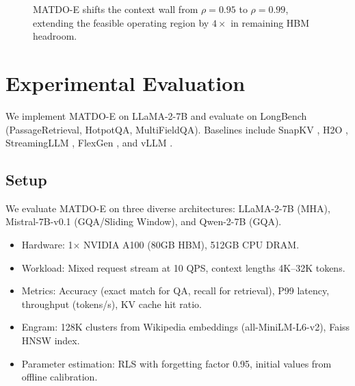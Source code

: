 \documentclass[11pt,a4paper]{article}
\theoremstyle{plain}
\theoremstyle{definition}
\begin{document}
\begin{figure}[t]
\centering
{}
\caption{MATDO-E shifts the context wall from $\rho=0.95$ to $\rho=0.99$, extending the feasible operating region by $4\times$ in remaining HBM headroom.}
\label{fig:postpone}
\end{figure}

\section{Experimental Evaluation}
\label{sec:experiments}
We implement MATDO-E on LLaMA-2-7B and evaluate on LongBench (PassageRetrieval, HotpotQA, MultiFieldQA). Baselines include SnapKV \cite{snapkv}, H2O \cite{h2o}, StreamingLLM \cite{streamingllm}, FlexGen \cite{flexgen}, and vLLM \cite{vllm}.

\subsection{Setup}
We evaluate MATDO-E on three diverse architectures: LLaMA-2-7B (MHA), Mistral-7B-v0.1 (GQA/Sliding Window), and Qwen-2-7B (GQA).
\begin{itemize}
    \item Hardware: 1$\times$ NVIDIA A100 (80GB HBM), 512GB CPU DRAM.
    \item Workload: Mixed request stream at 10 QPS, context lengths 4K--32K tokens.
    \item Metrics: Accuracy (exact match for QA, recall for retrieval), P99 latency, throughput (tokens/s), KV cache hit ratio.
    \item Engram: 128K clusters from Wikipedia embeddings (all-MiniLM-L6-v2), Faiss HNSW index.
    \item Parameter estimation: RLS with forgetting factor 0.95, initial values from offline calibration.
\end{itemize}
\end{document}
